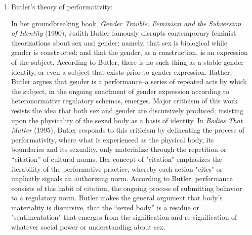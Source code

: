 \documentclass[11pt]{article}
\begin{document}
\begin{enumerate}
\item Butler's theory of performativity:
\label{sec:org4f42e2c}

In her groundbreaking book, \emph{Gender Trouble: Feminism and the
Subversion of Identity} (1990), Judith Butler famously disrupts
contemporary feminist theorizations about sex and gender; namely, that
sex is biological while gender is constructed; and that the gender, as
a construction, is an expression of the subject. According to Butler,
there is no such thing as a stable gender identity, or even a subject
that exists prior to gender expression. Rather, Butler argues that
gender is a performance--a series of repeated acts by which the
subject, in the ongoing enactment of gender expression according to
heteronormative regulatory schemas, emerges. Major criticism of this
work resists the idea that both sex and gender are discursively
produced, insisting upon the physicality of the sexed body as a basis
of identity. In \emph{Bodies That Matter} (1995), Butler responds to this
criticism by delineating the process of performativity, where what is
experienced as the physical body, its boundaries and its sexuality,
only materialize through the repetition or “citation” of cultural
norms. Her concept of "citation" emphasizes the iterability of the
performative practice, whereby each action "cites" or implicitly
signals an authorizing norm. According to Butler, performance consists
of this habit of citation, the ongoing process of submitting behavior
to a regulatory norm. Butler makes the general argument that body’s
materiality is discursive, that the “sexed body” is a residue or
"sentimentation" that emerges from the signification and
re-signification of whatever social power or understanding about sex.


\end{enumerate}
\end{document}
